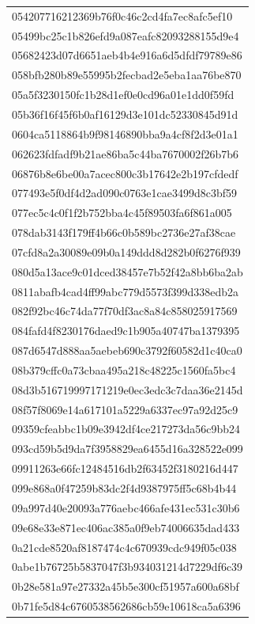 \begin{tabular}{l}
054207716212369b76f0c46c2cd4fa7ec8afc5ef10 \\
05499bc25c1b826efd9a087eafc82093288155d9e4 \\
05682423d07d6651aeb4b4e916a6d5dfdf79789e86 \\
058bfb280b89e55995b2fecbad2e5eba1aa76be870 \\
05a5f3230150fc1b28d1ef0e0cd96a01e1dd0f59fd \\
05b36f16f45f6b0af16129d3e101dc52330845d91d \\
0604ca5118864b9f98146890bba9a4cf8f2d3e01a1 \\
062623fdfadf9b21ae86ba5c44ba7670002f26b7b6 \\
06876b8e6be00a7acec800c3b17642e2b197cfdedf \\
077493e5f0df4d2ad090c0763e1cae3499d8c3bf59 \\
077ec5c4c0f1f2b752bba4c45f89503fa6f861a005 \\
078dab3143f179ff4b66c0b589bc2736e27af38cae \\
07cfd8a2a30089e09b0a149ddd8d282b0f6276f939 \\
080d5a13ace9c01dced38457e7b52f42a8bb6ba2ab \\
0811abafb4cad4ff99abc779d5573f399d338edb2a \\
082f92bc46c74da77f70df3ac8a84c858025917569 \\
084fafd4f8230176daed9c1b905a40747ba1379395 \\
087d6547d888aa5aebeb690c3792f60582d1c40ca0 \\
08b379cffc0a73cbaa495a218c48225c1560fa5bc4 \\
08d3b516719997171219e0ec3edc3c7daa36e2145d \\
08f57f8069e14a617101a5229a6337ec97a92d25c9 \\
09359cfeabbc1b09e3942df4ce217273da56c9bb24 \\
093cd59b5d9da7f3958829ea6455d16a328522e099 \\
09911263e66fc12484516db2f63452f3180216d447 \\
099e868a0f47259b83dc2f4d9387975ff5c68b4b44 \\
09a997d40e20093a776aebc466afe431ec531c30b6 \\
09e68e33e871ec406ac385a0f9eb74006635dad433 \\
0a21cde8520af8187474c4c670939cdc949f05c038 \\
0abe1b76725b5837047f3b934031214d7229df6c39 \\
0b28e581a97e27332a45b5e300cf51957a600a68bf \\
0b71fe5d84c6760538562686cb59e10618ca5a6396 \\

\end{tabular}
